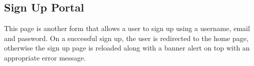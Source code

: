 \subsection{Sign Up Portal}
This page is another form that allows a user to sign up using a username, email and password. On a successful sign up, the user is redirected to the home page, otherwise the sign up page is reloaded along with a banner alert on top with an appropriate error message.
